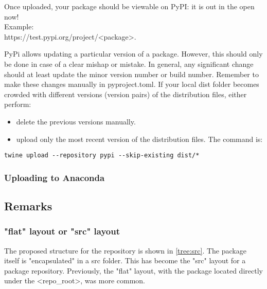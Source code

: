 Once uploaded, your package should be viewable on PyPI: it is out in the open now! \\
Example: \\ 
https://test.pypi.org/project/\textless package\textgreater.


PyPi allows updating a particular version of a package. However, this should only be done in case of a clear mishap or mistake. In general, any significant change should at least update the minor version number or build number. Remember to make these changes manually in \textsf{pyproject.toml}. If your local \textsf{dist} folder becomes crowded with different versions (version pairs) of the distribution files, either perform:
\begin{itemize}
	\item delete the previous versions manually.
	\item upload only the most recent version of the distribution files. The command is:
\end{itemize} 

\begin{lstlisting}[style=DOS]
	twine upload --repository pypi --skip-existing dist/*
\end{lstlisting}

\subsubsection{Uploading to Anaconda}

\subsection{Remarks}

\subsubsection{"flat" layout or "src" layout}

The proposed structure for the repository is shown in \ref{tree:src}. The package itself is "encapsulated" in a \textsf{src} folder.
This has become the "src" layout for a package repository. Previously, the "flat" layout, with the package located directly under the \textless repo\_root\textgreater, was more common.

